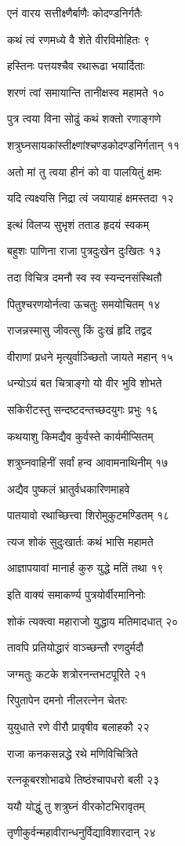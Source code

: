 एनं वारय सत्तीक्ष्णैर्बाणैः कोदण्डनिर्गतैः

कथं त्वं रणमध्ये वै शेते वीरविमोहितः ९

हस्तिनः पत्तयश्चैव रथारूढा भयार्दिताः

शरणं त्वां समायान्ति तानीक्षस्व महामते १०

पुत्र त्वया विना सोढुं कथं शक्तो रणाङ्गणे

शत्रुघ्नसायकांस्तीक्ष्णांश्चण्डकोदण्डनिर्गतान् ११

अतो मां तु त्वया हीनं को वा पालयितुं क्षमः

यदि त्यक्ष्यसि निद्रा त्वं जयायाहं क्षमस्तदा १२

इत्थं विलप्य सुभृशं तताड हृदयं स्वकम्

बहुशः पाणिना राजा पुत्रदुःखेन दुःखितः १३

तदा विचित्र दमनौ स्व स्व स्यन्दनसंस्थितौ

पितुश्चरणयोर्नत्वा ऊचतुः समयोचितम् १४

राजन्नस्मासु जीवत्सु किं दुःखं हृदि तद्वद

वीराणां प्रधने मृत्युर्वाञ्च्छितो जायते महान् १५

धन्योऽयं बत चित्राङ्गो यो वीर भुवि शोभते

सकिरीटस्तु सन्दष्टदन्तच्छदयुगः प्रभुः १६

कथयाशु किमद्यैव कुर्वस्ते कार्यमीप्सितम्

शत्रुघ्नवाहिनीं सर्वां हन्व आवामनाथिनीम् १७

अद्यैव पुष्कलं भ्रातुर्वधकारिणमाहवे

पातयावो रथाच्छित्त्वा शिरोमुकुटमण्डितम् १८

त्यज शोकं सुदुःखार्तः कथं भासि महामते

आज्ञापयावां मानार्ह कुरु युद्धे मतिं तथा १९

इति वाक्यं समाकर्ण्य पुत्रयोर्वीरमानिनोः

शोकं त्यक्त्वा महाराजो युद्धाय मतिमादधात् २०

तावपि प्रतियोद्धारं वाञ्च्छन्तौ रणदुर्मदौ

जग्मतुः कटके शत्रोरनन्तभटपूरिते २१

रिपुतापेन दमनो नीलरत्नेन चेतरः

युयुधाते रणे वीरौ प्रावृषीव बलाहकौ २२

राजा कनकसन्नद्धे रथे मणिविचित्रिते

रत्नकूबरशोभाढ्ये तिष्ठंश्चापधरो बली २३

ययौ योद्धुं तु शत्रुघ्नं वीरकोटभिरावृतम्

तृणीकुर्वन्महावीरान्धनुर्विद्याविशारदान् २४

